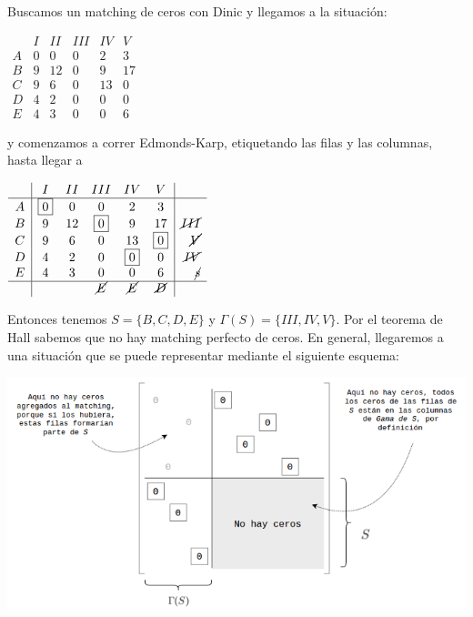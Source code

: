 \documentclass[10pt,a4paper]{article}
\begin{document}
Buscamos un matching de ceros con Dinic y llegamos a la situación:

\begin{center}
$\begin{array}{c|ccccc} & I & II & III & IV & V \\ A & \boxed{0} & 0 & 0 & 2 & 3\\ B & 9 & 12 & \boxed{0} & 9 & 17 \\ C & 9 & 6 & 0 & 13 & \boxed{0} \\ D & 4 & 2 & 0 & \boxed{0} & 0 \\ E & 4 & 3 & 0 & 0 & 6 \end{array}$
\end{center}

y comenzamos a correr Edmonds-Karp, etiquetando las filas y las columnas, hasta llegar a

\begin{center}
$\begin{array}{c|ccccc| r} & I & II & III & IV & V \\ \hline A & \boxed{0} & 0 & 0 & 2 & 3\\ B & 9 & 12 & \boxed{0} & 9 & 17 & \cancel{III}\\ C & 9 & 6 & 0 & 13 & \boxed{0} & \cancel{V}\\ D & 4 & 2 & 0 & \boxed{0} & 0 & \cancel{IV}\\ E & 4 & 3 & 0 & 0 & 6 & \cancel{s}\\ \hline & & & \cancel{E}& \cancel{E}& \cancel{D}& \end{array}$
\end{center}

Entonces tenemos $S = \{B, C, D, E\}$ y $\Gamma(S) = \{III, IV, V\}$. Por el teorema de Hall sabemos que no hay matching perfecto de ceros. En general, llegaremos a una situación que se puede representar mediante el siguiente esquema:

\begin{center}

    \begin{adjustbox}{max size={\textwidth}{\textheight}}
        \includegraphics{definitions/matching_16.jpg}
        \end{adjustbox}
    
\end{center}
\end{document}
